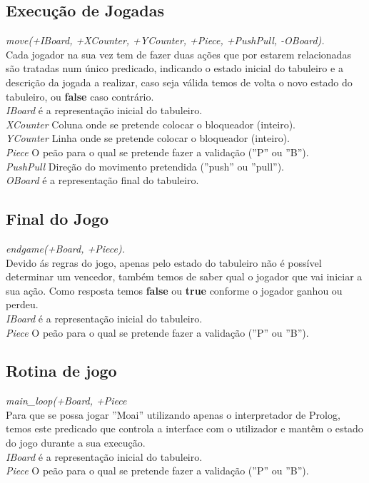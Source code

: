 \documentclass[15pt,a4paper]{article}
\begin{document}
\subsection{Execução de Jogadas}
\textit{move(+IBoard, +XCounter, +YCounter, +Piece, +PushPull, -OBoard).}\\
Cada jogador na sua vez tem de fazer duas ações que por estarem relacionadas são tratadas num único predicado, indicando o estado inicial do tabuleiro e a descrição da jogada a realizar, caso seja válida temos de volta o novo estado do tabuleiro, ou \textbf{false} caso contrário.\\
\textit{IBoard} é a representação inicial do tabuleiro.\\
\textit{XCounter} Coluna onde se pretende colocar o bloqueador (inteiro).\\
\textit{YCounter} Linha onde se pretende colocar o bloqueador (inteiro).\\
\textit{Piece} O peão para o qual se pretende fazer a validação (''P'' ou ''B'').\\
\textit{PushPull} Direção do movimento pretendida (''push'' ou ''pull'').\\
\textit{OBoard} é a representação final do tabuleiro.\\


\subsection{Final do Jogo}
\textit{endgame(+Board, +Piece).}\\
Devido ás regras do jogo, apenas pelo estado do tabuleiro não é possível determinar um vencedor, também temos de saber qual o jogador que vai iniciar a sua ação. Como resposta temos \textbf{false} ou \textbf{true} conforme o jogador ganhou ou perdeu.\\
\textit{IBoard} é a representação inicial do tabuleiro.\\
\textit{Piece} O peão para o qual se pretende fazer a validação (''P'' ou ''B'').\\

\subsection{Rotina de jogo}
\textit{main\_loop(+Board, +Piece}\\
Para que se possa jogar ''Moai'' utilizando apenas o interpretador de Prolog, temos este predicado que controla a interface com o utilizador e mantêm o estado do jogo durante a sua execução.\\
\textit{IBoard} é a representação inicial do tabuleiro.\\
\textit{Piece} O peão para o qual se pretende fazer a validação (''P'' ou ''B'').\\
\end{document}
